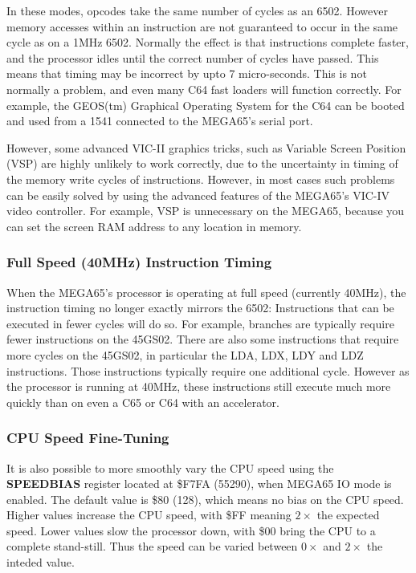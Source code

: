 In these modes, opcodes take the same number of cycles as an 6502.  However memory accesses within an
instruction are not guaranteed to occur in the same cycle as on a 1MHz 6502.  Normally
the effect is that instructions complete faster, and the processor idles until the
correct number of cycles have passed. This means that timing may be incorrect by upto
7 micro-seconds.  This is not normally a problem, and even many C64 fast loaders will
function correctly. For example, the GEOS(tm) Graphical Operating System for the C64
can be booted and used from a 1541 connected to the MEGA65's serial port.

However, some advanced VIC-II graphics tricks, such as Variable Screen Position (VSP) are
highly unlikely to work correctly, due to the uncertainty in timing of the memory write
cycles of instructions.  However, in most cases such problems can be easily solved by using
the advanced features of the MEGA65's VIC-IV video controller.  For example, VSP is unnecessary
on the MEGA65, because you can set the screen RAM address to any location in memory.

\subsubsection{Full Speed (40MHz) Instruction Timing}

When the MEGA65's processor is operating at full speed (currently 40MHz), the instruction
timing no longer exactly mirrors the 6502: Instructions that can be executed in fewer cycles
will do so. For example, branches are typically require fewer instructions on the 45GS02.
There are also some instructions that require more cycles on the 45GS02, in particular the
LDA, LDX, LDY and LDZ instructions. Those instructions typically require one additional cycle.
However as the processor is running at 40MHz, these instructions still execute much more quickly
than on even a C65 or C64 with an accelerator.

\subsubsection{CPU Speed Fine-Tuning}
It is also possible to more smoothly
vary the CPU speed using the {\bf SPEEDBIAS} register located at \$F7FA (55290), when MEGA65 IO mode
is enabled.  The default value is \$80 (128), which means no bias on the CPU speed.  Higher values
increase the CPU speed, with \$FF meaning $2\times$ the expected speed. Lower values slow
the processor down, with \$00 bring the CPU to a complete stand-still.  Thus the speed can be
varied between $0\times$ and $2\times$ the inteded value.

